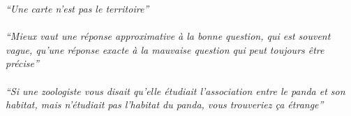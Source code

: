 
\begin{flushright}
  \itshape
  \enquote{Une carte n'est pas le territoire}\\
  \citeauthor{korzybski_carte_1998}\\ 
  \enquote{Mieux vaut une réponse approximative à la bonne question, qui est souvent vague, qu'une réponse exacte à la mauvaise question qui peut toujours être précise}\\
  \citeauthor{tukey_future_1962}\\ 
  \enquote{Si une zoologiste vous disait qu'elle étudiait l'association entre le panda et son habitat, mais n'étudiait pas l'habitat du panda, vous trouveriez ça étrange}\\
  \citeauthor{manville_travel_2017}\\

\end{flushright}
